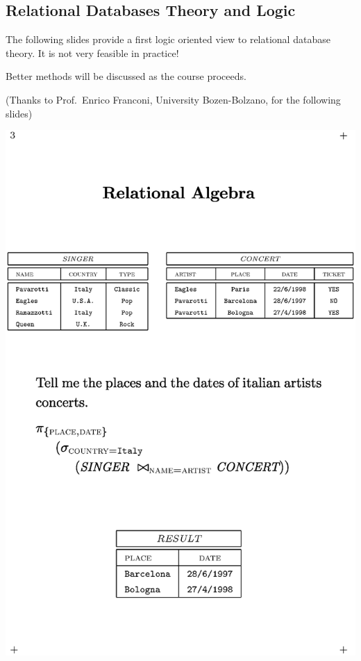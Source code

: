 \documentclass[a4,11pt,
slidesonly,
portrait,
fleqn]{seminar}
\begin{document}
\begin{slide*}
  \section*{Relational Databases Theory and Logic}
The following slides provide a first logic oriented view to relational
database theory. It is not very feasible in practice! 

Better methods will be discussed as the course proceeds.

(Thanks to Prof.\ Enrico Franconi, University Bozen-Bolzano, 
for the following slides)
\end{slide*}
\begin{slide*}
\includegraphics[width=0.95\linewidth]{relalg}
\end{slide*}
\end{document}
